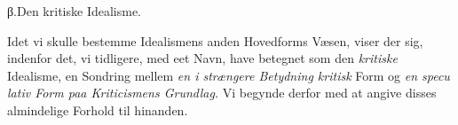 \divrule

\begin{center}β.\enspace Den kritiske Idealisme.\end{center}

Idet vi skulle bestemme Idealismens anden Hovedforms
Væsen, viser der sig, indenfor det, vi tidligere, med eet Navn,
have betegnet som den \emph{kritiske} Idealisme, en Sondring mellem
\emph{en i strængere Betydning kritisk} Form og \emph{en specu\-%
lativ Form paa Kriticismens Grundlag.} Vi begynde
derfor med at angive disses almindelige Forhold til hinanden.

